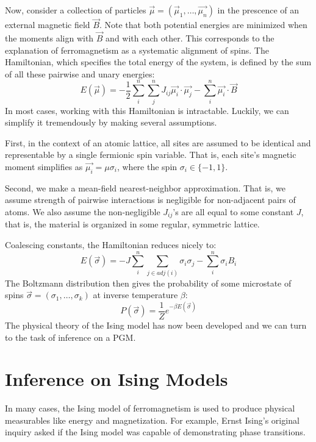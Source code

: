 \documentclass{article}
\begin{document}
Now, consider a collection of particles 
$\vec{\mu} = (\vec{\mu}_1, \dots, \vec{\mu_n})$ 
in the prescence of an external magnetic field $\vec{B}$. 
Note that both potential energies are minimized when the moments align with 
$\vec{B}$ and with each other. 
This corresponds to the explanation of ferromagnetism as a systematic alignment 
of spins. 
The Hamiltonian, which specifies the total energy of the system, is defined by 
the sum of all these pairwise and unary energies:
\begin{equation}\label{eq:exactE}
    E(\vec{\mu}) = -\frac{1}{2}\sum_i^n \sum_j^n J_{ij} \vec{\mu_i} \cdot \vec{\mu_j} - \sum_i^n \vec{\mu_i} \cdot \vec{B}
\end{equation}
In most cases, working with this Hamiltonian is intractable. 
Luckily, we can simplify it tremendously by making several assumptions. 

First, in the context of an atomic lattice, all sites are assumed to be 
identical and representable by a single fermionic spin variable. 
That is, each site's magnetic moment simplifies as $\vec{\mu_i} = \mu \sigma_i$, 
where the spin $\sigma_i \in \{-1, 1\}$. 

Second, we make a mean-field nearest-neighbor approximation. 
That is, we assume strength of pairwise interactions is negligible for 
non-adjacent pairs of atoms. 
We also assume the non-negligible $J_{ij}$'s are all equal to some constant $J$, 
that is, the material is organized in some regular, symmetric lattice. 

Coalescing constants, the Hamiltonian reduces nicely to:
\begin{equation}\label{eq:isingE}
    E(\vec{\sigma}) = -J\sum_i^n \sum_{j \in adj(i)} \sigma_i \sigma_j - \sum_i^n \sigma_i B_i
\end{equation}
The Boltzmann distribution then gives the probability of some microstate of 
spins $\vec{\sigma} = (\sigma_1, \dots, \sigma_k)$ at inverse temperature $\beta$:
\begin{equation} \label{eq:boltzmann}
    P(\vec{\sigma}) = \frac{1}{Z}e^{-\beta E(\vec{\sigma})} 
\end{equation}
The physical theory of the Ising model has now been developed and we can turn to 
the task of inference on a PGM. 
%
%
%
%
%
\section{Inference on Ising Models}
%
%
%
%
%
In many cases, the Ising model of ferromagnetism is used to produce physical 
measurables like energy and magnetization. 
For example, Ernst Ising's original inquiry asked if the Ising model was capable 
of demonstrating phase transitions. 
\end{document}
